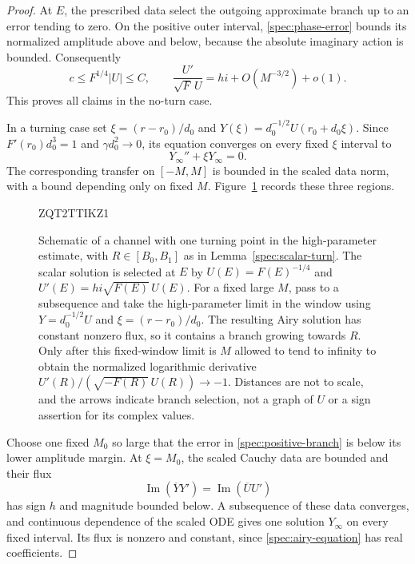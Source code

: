 \documentclass[11pt]{article}
\numberwithin{equation}{section}
\theoremstyle{definition}
\theoremstyle{remark}
\begin{document}
\begin{proof}
At $E$, the prescribed data select the outgoing approximate branch
up to an error tending to zero. On the positive outer interval,
\eqref{spec:phase-error} bounds its normalized amplitude above and
below, because the absolute imaginary action is bounded. Consequently
\begin{equation}\label{spec:positive-branch}
 c\le F^{1/4}|U|\le C,\qquad
 \frac{U'}{\sqrt F\,U}=hi+O(M^{-3/2})+o(1).
\end{equation}
This proves all claims in the no-turn case.

In a turning case set $\xi=(r-r_0)/d_0$ and
$Y(\xi)=d_0^{-1/2}U(r_0+d_0\xi)$. Since
$F'(r_0)d_0^3=1$ and $\gamma d_0^2\to0$, its equation converges on
every fixed $\xi$ interval to
\begin{equation}\label{spec:airy-equation}
 Y_\infty''+\xi Y_\infty=0.
\end{equation}
The corresponding transfer on $[-M,M]$ is bounded in the scaled data
norm, with a bound depending only on fixed $M$.
Figure~\ref{fig:turning} records these three regions.
\begin{figure}[tbp]
  
  \begingroup
  
  ZQT2TTIKZ1
  \endgroup
  \caption{Schematic of a channel with one turning point in the
  high-parameter estimate, with $R\in[B_0,B_1]$ as in
  Lemma~\ref{spec:scalar-turn}. The scalar solution is selected at $E$ by
  $U(E)=F(E)^{-1/4}$ and $U'(E)=h i\sqrt{F(E)}\,U(E)$.
  For a fixed large $M$, pass to a subsequence and take the
  high-parameter limit in the window using $Y=d_0^{-1/2}U$
  and $\xi=(r-r_0)/d_0$.
  The resulting Airy solution has constant nonzero flux, so it contains
  a branch growing towards $R$.
  Only after this fixed-window limit is $M$ allowed to tend to infinity
  to obtain the normalized logarithmic derivative
  $U'(R)/(\sqrt{-F(R)}\,U(R))\to-1$.
  Distances are not to scale, and the arrows indicate branch selection,
  not a graph of $U$ or a sign assertion for its complex values.}
  \label{fig:turning}
\end{figure}


Choose one fixed $M_0$ so large that the error in
\eqref{spec:positive-branch} is below its lower amplitude margin.
At $\xi=M_0$, the scaled Cauchy data are bounded and their flux
\[
 \operatorname{Im}(\overline Y Y')
 =\operatorname{Im}(\overline U U')
\]
has sign $h$ and magnitude bounded below. A subsequence of these data
converges, and continuous dependence of the scaled ODE gives one
solution $Y_\infty$ on every fixed interval. Its flux is nonzero and
constant, since \eqref{spec:airy-equation} has real coefficients.


\end{proof}
\end{document}
